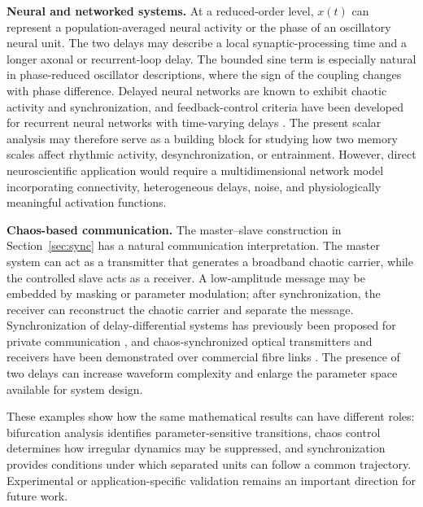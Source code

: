 \documentclass[11pt]{article}
\theoremstyle{remark}
\begin{document}
{\textbf{Neural and networked systems.}
At a reduced-order level, $x(t)$ can represent a population-averaged neural activity or the phase of an oscillatory neural unit. The two delays may describe a local synaptic-processing time and a longer axonal or recurrent-loop delay. The bounded sine term is especially natural in phase-reduced oscillator descriptions, where the sign of the coupling changes with phase difference. Delayed neural networks are known to exhibit chaotic activity and synchronization, and feedback-control criteria have been developed for recurrent neural networks with time-varying delays \cite{cui2009synchronization}. The present scalar analysis may therefore serve as a building block for studying how two memory scales affect rhythmic activity, desynchronization, or entrainment. However, direct neuroscientific application would require a multidimensional network model incorporating connectivity, heterogeneous delays, noise, and physiologically meaningful activation functions.

\textbf{Chaos-based communication.}
The master--slave construction in Section~\ref{sec:sync} has a natural communication interpretation. The master system can act as a transmitter that generates a broadband chaotic carrier, while the controlled slave acts as a receiver. A low-amplitude message may be embedded by masking or parameter modulation; after synchronization, the receiver can reconstruct the chaotic carrier and separate the message. Synchronization of delay-differential systems has previously been proposed for private communication \cite{mensour1998synchronization}, and chaos-synchronized optical transmitters and receivers have been demonstrated over commercial fibre links \cite{argyris2005chaos}. The presence of two delays can increase waveform complexity and enlarge the parameter space available for system design. 

These examples show how the same mathematical results can have different roles: bifurcation analysis identifies parameter-sensitive transitions, chaos control determines how irregular dynamics may be suppressed, and synchronization provides conditions under which separated units can follow a common trajectory. Experimental or application-specific validation remains an important direction for future work.
}
\end{document}
